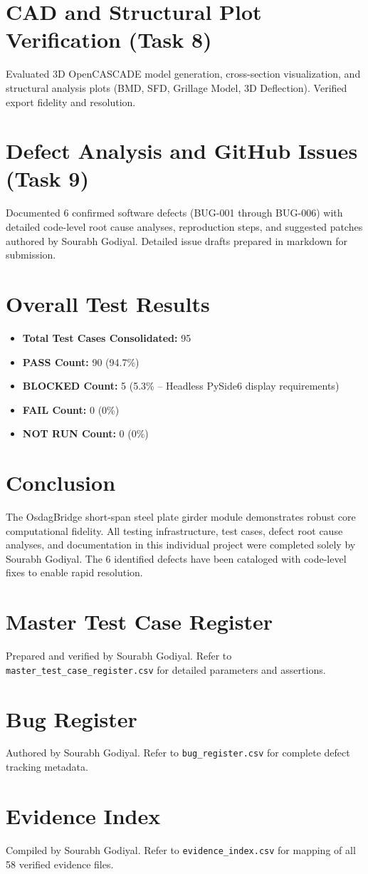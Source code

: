 \documentclass[11pt,a4paper]{report}
\begin{document}
\chapter{CAD and Structural Plot Verification (Task 8)}
Evaluated 3D OpenCASCADE model generation, cross-section visualization, and structural analysis plots (BMD, SFD, Grillage Model, 3D Deflection). Verified export fidelity and resolution.

\chapter{Defect Analysis and GitHub Issues (Task 9)}
Documented 6 confirmed software defects (BUG-001 through BUG-006) with detailed code-level root cause analyses, reproduction steps, and suggested patches authored by Sourabh Godiyal. Detailed issue drafts prepared in markdown for submission.

\chapter{Overall Test Results}
\begin{itemize}
    \item \textbf{Total Test Cases Consolidated:} 95
    \item \textbf{PASS Count:} 90 (94.7\%)
    \item \textbf{BLOCKED Count:} 5 (5.3\% -- Headless PySide6 display requirements)
    \item \textbf{FAIL Count:} 0 (0\%)
    \item \textbf{NOT RUN Count:} 0 (0\%)
\end{itemize}

\chapter{Conclusion}
The OsdagBridge short-span steel plate girder module demonstrates robust core computational fidelity. All testing infrastructure, test cases, defect root cause analyses, and documentation in this individual project were completed solely by Sourabh Godiyal. The 6 identified defects have been cataloged with code-level fixes to enable rapid resolution.

\appendix
\chapter{Master Test Case Register}
Prepared and verified by Sourabh Godiyal. Refer to \texttt{master\_test_case_register.csv} for detailed parameters and assertions.

\chapter{Bug Register}
Authored by Sourabh Godiyal. Refer to \texttt{bug_register.csv} for complete defect tracking metadata.

\chapter{Evidence Index}
Compiled by Sourabh Godiyal. Refer to \texttt{evidence_index.csv} for mapping of all 58 verified evidence files.
\end{document}
